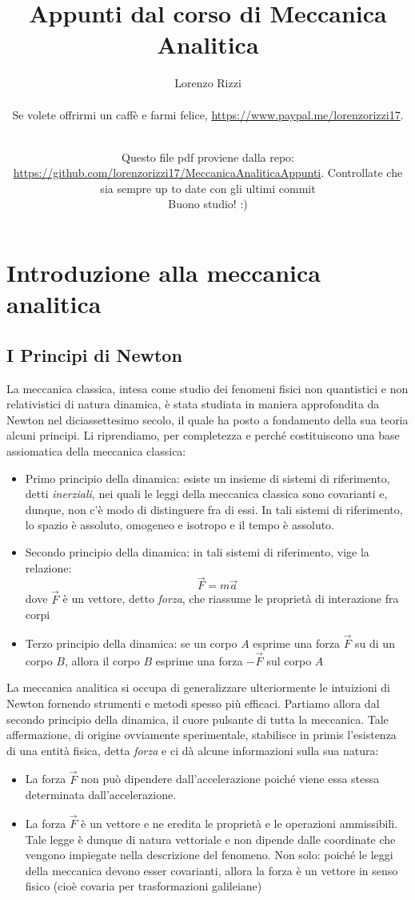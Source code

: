 \documentclass[a4paper,openany]{article}
\title{\textbf{Appunti dal corso di Meccanica Analitica} }
\author{Lorenzo Rizzi
	\\ \\
	Se volete offrirmi un caffè e farmi felice, \url{https://www.paypal.me/lorenzorizzi17}.   }
\date{\\ Questo file pdf proviene dalla repo: \url{https://github.com/lorenzorizzi17/MeccanicaAnaliticaAppunti}. Controllate che sia sempre up to date con gli ultimi commit \\ Buono studio! :)}
\begin{document}
	\newpage
	\maketitle
	\newpage 
	\tableofcontents
	\newpage
	\section{Introduzione alla meccanica analitica}
	\subsection{I Principi di Newton}
	La meccanica classica, intesa come studio dei fenomeni fisici non quantistici e non relativistici di natura dinamica, è stata studiata in maniera approfondita da Newton nel diciassettesimo secolo, il quale ha posto a fondamento della sua teoria alcuni principi. Li riprendiamo, per completezza e perché costituiscono una base assiomatica della meccanica classica:
	\begin{itemize}
		\item  Primo principio della dinamica: esiste un insieme di sistemi di riferimento, detti \textit{inerziali}, nei quali le leggi della meccanica classica sono covarianti e, dunque, non c'è modo di distinguere fra di essi. In tali sistemi di riferimento, lo spazio è assoluto, omogeneo e isotropo e il tempo è assoluto.
		\item Secondo principio della dinamica: in tali sistemi di riferimento, vige la relazione:
		$$
		\vec{F} = m\vec{a}
		$$
		dove $\vec{F}$ è un vettore, detto \textit{forza}, che riassume le proprietà di interazione fra corpi
		\item Terzo principio della dinamica: se un corpo $A$ esprime una forza $\vec{F}$ su di un corpo $B$, allora il corpo $B$ esprime una forza $-\vec{F}$ sul corpo $A$
	\end{itemize}
	La meccanica analitica si occupa di generalizzare ulteriormente le intuizioni di Newton fornendo strumenti e metodi spesso più efficaci.
	Partiamo allora dal secondo principio della dinamica, il cuore pulsante di tutta la meccanica. Tale affermazione, di origine ovviamente sperimentale, stabilisce in primis l'esistenza di una entità fisica, detta \textit{forza} e ci dà alcune informazioni sulla sua natura:
	\begin{itemize}
		\item La forza $\vec{F}$ non può dipendere dall'accelerazione poiché viene essa stessa determinata dall'accelerazione. 
		\item La forza $\vec{F}$ è un vettore e ne eredita le proprietà e le operazioni ammissibili. Tale legge è dunque di natura vettoriale e non dipende dalle coordinate che vengono impiegate nella descrizione del fenomeno. Non solo: poiché le leggi della meccanica devono esser covarianti, allora la forza è un vettore in senso fisico (cioè covaria per trasformazioni galileiane)	
	\end{itemize}
	
\end{document}
